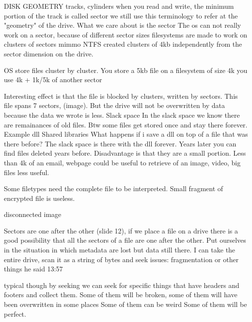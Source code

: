         DISK GEOMETRY
            tracks, cylinders
            when you read and write, the minimum portion of the track is called sector
            we still use this terminology to refer at the "geometry" of the drive.
            What we care about is the sector 
            The os can not really work on a sector, because of different sector sizes 
            filesystems are made to work on clusters of sectors 
            mimmo NTFS created clusters of 4kb 
            independently from the sector dimension on the drive.
            
            OS store files cluster by cluster. You store a 5kb file on a filesystem of size 4k you use 4k + 1k/5k of another sector 

            Interesting effect is that the file is blocked by clusters, written by sectors. This file spans 7 sectors, (image). But the drive will not be overwritten by data because the data we wrote is less.
            Slack space 
            In the slack space we know there are remainances of old files.
            Btw some files get stored once and stay there forever. Example dll 
            Shared libraries 
            What happens if i save a dll on top of a file that was there before?
            The slack space is there with the dll forever.
            Years later you can find files deleted years before.
            Disadvantage is that they are a small portion.
            Less than 4k of an email, webpage could be useful to retrieve
            of an image, video, big files less useful.

            Some filetypes need the complete file to be interpreted.
            Small fragment of encrypted file is useless.

            disconnected image 

            Sectors are one after the other (slide 12), if we place a file on a drive there is a good possibility that all the sectors of a file are one after the other.
            Put ourselves in the situation in which metadata are lost but data still there.
            I can take the entire drive, scan it as a string of bytes and seek 
            issues: fragmentation or other things he said 13:57

            typical though by seeking we can seek for specific things that have headers and footers and collect them.
            Some of them will be broken, some of them will have been overwritten in some places 
            Some of them can be weird 
            Some of them will be perfect. 

